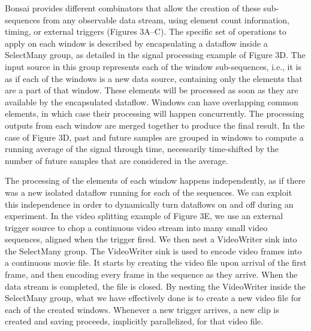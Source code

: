 Bonsai provides different combinators that allow the creation of these sub-sequences from any observable data stream, using element count information, timing, or external triggers (Figures 3A–C). The specific set of operations to apply on each window is described by encapsulating a dataflow inside a SelectMany group, as detailed in the signal processing example of Figure 3D. The input source in this group represents each of the window sub-sequences, i.e., it is as if each of the windows is a new data source, containing only the elements that are a part of that window. These elements will be processed as soon as they are available by the encapsulated dataflow. Windows can have overlapping common elements, in which case their processing will happen concurrently. The processing outputs from each window are merged together to produce the final result. In the case of Figure 3D, past and future samples are grouped in windows to compute a running average of the signal through time, necessarily time-shifted by the number of future samples that are considered in the average.

The processing of the elements of each window happens independently, as if there was a new isolated dataflow running for each of the sequences. We can exploit this independence in order to dynamically turn dataflows on and off during an experiment. In the video splitting example of Figure 3E, we use an external trigger source to chop a continuous video stream into many small video sequences, aligned when the trigger fired. We then nest a VideoWriter sink into the SelectMany group. The VideoWriter sink is used to encode video frames into a continuous movie file. It starts by creating the video file upon arrival of the first frame, and then encoding every frame in the sequence as they arrive. When the data stream is completed, the file is closed. By nesting the VideoWriter inside the SelectMany group, what we have effectively done is to create a new video file for each of the created windows. Whenever a new trigger arrives, a new clip is created and saving proceeds, implicitly parallelized, for that video file.


